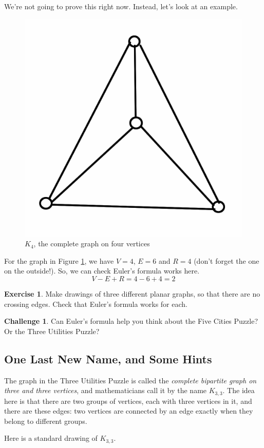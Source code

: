 \documentclass[12pt,letterpaper]{article}
\theoremstyle{definition}
\newtheorem{exercise}[question]{Exercise}
\newtheorem*{challenge}{Challenge}
\begin{document}
We're not going to prove this right now. Instead, let's look at an example.

\begin{figure}[h]
\centering
\includegraphics[width=.4\textwidth]{images/std_k4.png}
\caption{$K_4$, the complete graph on four vertices}
\label{figure:stdk4}
\end{figure}

For the graph in Figure \ref{figure:stdk4}, we have $V=4$, $E=6$ and $R=4$ (don't forget the one on the outside!). So, we can check Euler's formula works here.
\[
V - E + R = 4 - 6 + 4 = 2
\]

\begin{exercise}
Make drawings of three different planar graphs, so that there are no crossing edges. Check that
Euler's formula works for each.
\end{exercise}

\begin{challenge}
Can Euler's formula help you think about the Five Cities Puzzle? Or the Three Utilities Puzzle?
\end{challenge}

\subsection*{One Last New Name, and Some Hints}

The graph in the Three Utilities Puzzle is called the \emph{complete bipartite graph on three and three vertices},
and mathematicians call it by the name $K_{3,3}$. The idea here is that there are two groups of vertices, 
each with three vertices in it, and there are these edges: two vertices are connected by an edge exactly when they 
belong to different groups.

Here is a standard drawing of $K_{3,3}$.
\end{document}
